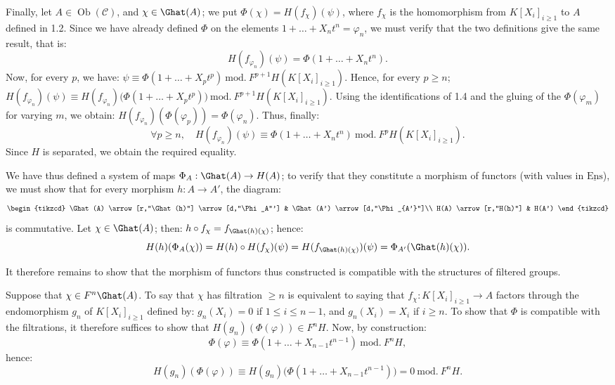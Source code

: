 Finally, let \(A\in\operatorname{Ob}(\mathcal C)\), and \(\chi\in\Ghat(A)\); we put \(\Phi(\chi)=H(f_\chi)(\psi)\), where \(f_\chi\) is the homomorphism from \(K[X_i]_{i\geq 1}\) to \(A\) defined in 1.2. Since we have already defined \(\Phi\) on the elements \(1+\ldots+X_nt^n=\varphi_n\), we must verify that the two definitions give the same result, that is:
\[
  H(f_{\varphi_n})(\psi)=\Phi(1+\ldots+X_nt^n).
\]
Now, for every \(p\), we have: \(\psi\equiv \Phi(1+\ldots+X_pt^p)\ \mathrm{mod.}\ F^{p+1}H(K[X_i]_{i\geq 1})\). Hence, for every \(p\geq n\); \(H(f_{\varphi_n})(\psi)\equiv H(f_{\varphi_n})\bigl(\Phi(1+\ldots+X_pt^p)\bigr)\ \mathrm{mod.}\ F^{p+1}H(K[X_i]_{i\geq 1})\). Using the identifications of 1.4 and the gluing of the \(\Phi(\varphi_m)\) for varying \(m\), we obtain: \(H(f_{\varphi_n})(\Phi(\varphi_p))=\Phi(\varphi_n)\).
Thus, finally:
\[
  \forall p\geq n,\quad
  H(f_{\varphi_n})(\psi)\equiv \Phi(1+\ldots+X_nt^n)
  \ \mathrm{mod.}\ F^pH(K[X_i]_{i\geq 1}).
\]
Since \(H\) is separated, we obtain the required equality.

We have thus defined a system of maps \(\Phi_A:\Ghat(A)\to H(A)\); to verify that they constitute a morphism of functors (with values in \(\underline{\mathrm{Ens}}\)), we must show that for every morphism \(h:A\to A'\), the diagram:
\[
\begin{tikzcd}
\Ghat(A) \arrow[r,"\Ghat(h)"] \arrow[d,"\Phi_A"'] &
\Ghat(A') \arrow[d,"\Phi_{A'}"]\\
H(A) \arrow[r,"H(h)"] & H(A')
\end{tikzcd}
\]
%
is commutative. Let \(\chi\in\Ghat(A)\); then: \(h\circ f_\chi=f_{\Ghat(h)(\chi)}\); hence:
\[
  H(h)(\Phi_A(\chi))=H(h)\circ H(f_\chi)(\psi)
  =H(f_{\Ghat(h)(\chi)})(\psi)=\Phi_{A'}(\Ghat(h)(\chi)).
\]

It therefore remains to show that the morphism of functors thus constructed is compatible with the structures of filtered groups.

Suppose that \(\chi\in F^n\Ghat(A)\). To say that \(\chi\) has filtration \(\geq n\) is equivalent to saying that \(f_\chi:K[X_i]_{i\geq 1}\to A\) factors through the endomorphism \(g_n\) of \(K[X_i]_{i\geq 1}\) defined by: \(g_n(X_i)=0\) if \(1\leq i\leq n-1\), and \(g_n(X_i)=X_i\) if \(i\geq n\).
To show that \(\Phi\) is compatible with the filtrations, it therefore suffices to show that \(H(g_n)(\Phi(\varphi))\in F^nH\). Now, by construction:
\[
  \Phi(\varphi)\equiv \Phi(1+\ldots+X_{n-1}t^{n-1})\ \mathrm{mod.}\ F^nH,
\]
hence:
\[
  H(g_n)(\Phi(\varphi))
  \equiv H(g_n)\bigl(\Phi(1+\ldots+X_{n-1}t^{n-1})\bigr)
  =0\ \mathrm{mod.}\ F^nH.
\]

